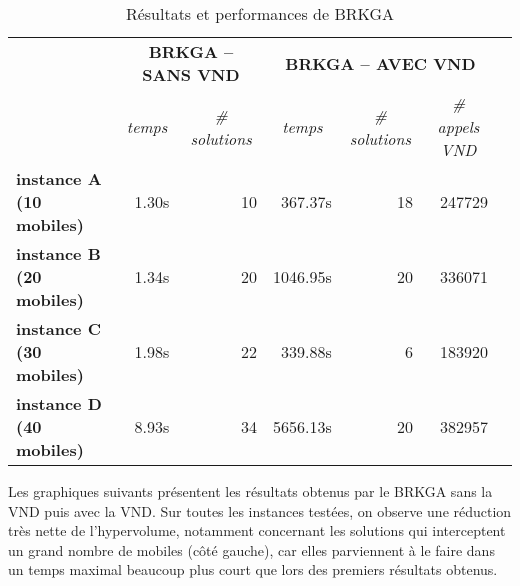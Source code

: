             \begin{table}[H]
                \centering
                \begin{tabular}{r|r|r|r|r|r|l}
                \cline{2-6}
                \multicolumn{1}{l|}{\multirow{2}{*}{}}                 & \multicolumn{2}{c|}{\textbf{BRKGA -- SANS VND}}                                  & \multicolumn{3}{c|}{\textbf{BRKGA -- AVEC VND}}                                                                                &  \\ \cline{2-6}
                \multicolumn{1}{l|}{}                                  & \multicolumn{1}{c|}{\textit{temps}} & \multicolumn{1}{c|}{\textit{\# solutions}} & \multicolumn{1}{c|}{\textit{temps}} & \multicolumn{1}{c|}{\textit{\# solutions}} & \multicolumn{1}{c|}{\textit{\# appels VND}} &  \\ \cline{1-6}
                \multicolumn{1}{|l|}{\textbf{instance A (10 mobiles)}} & 1.30s                               & 10                                         & 367.37s                             & 18                                         & 247729                                      &  \\ \cline{1-6}
                \multicolumn{1}{|l|}{\textbf{instance B (20 mobiles)}} & 1.34s                               & 20                                         & 1046.95s                            & 20                                         & 336071                                      &  \\ \cline{1-6}
                \multicolumn{1}{|l|}{\textbf{instance C (30 mobiles)}} & 1.98s                               & 22                                         & 339.88s                             & 6                                          & 183920                                      &  \\ \cline{1-6}
                \multicolumn{1}{|l|}{\textbf{instance D (40 mobiles)}} & 8.93s                               & 34                                         & 5656.13s                            & 20                                         & 382957                                      &  \\ \cline{1-6}
                \end{tabular}
                \caption{Résultats et performances de BRKGA}
                \label{tab:brkga}
            \end{table}
            
            Les graphiques suivants présentent les résultats obtenus par le BRKGA sans la VND puis avec la VND. Sur toutes les instances testées, on observe une réduction très nette de l'hypervolume, notamment concernant les solutions qui interceptent un grand nombre de mobiles (côté gauche), car elles parviennent à le faire dans un temps maximal beaucoup plus court que lors des premiers résultats obtenus.
            
